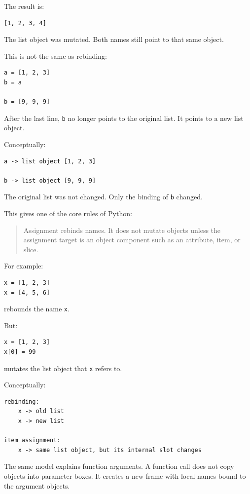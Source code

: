 The result is:

\begin{verbatim}
[1, 2, 3, 4]
\end{verbatim}

The list object was mutated. Both names still point to that same object.

This is not the same as rebinding:

\begin{verbatim}
a = [1, 2, 3]
b = a

b = [9, 9, 9]
\end{verbatim}

After the last line, \texttt{b} no longer points to the original list. It points to a new list object.

Conceptually:

\begin{verbatim}
a -> list object [1, 2, 3]

b -> list object [9, 9, 9]
\end{verbatim}

The original list was not changed. Only the binding of \texttt{b} changed.

This gives one of the core rules of Python:

\begin{quote}
Assignment rebinds names. It does not mutate objects unless the assignment target is an object component such as an attribute, item, or slice.
\end{quote}

For example:

\begin{verbatim}
x = [1, 2, 3]
x = [4, 5, 6]
\end{verbatim}

rebounds the name \texttt{x}.

But:

\begin{verbatim}
x = [1, 2, 3]
x[0] = 99
\end{verbatim}

mutates the list object that \texttt{x} refers to.

Conceptually:

\begin{verbatim}
rebinding:
    x -> old list
    x -> new list

item assignment:
    x -> same list object, but its internal slot changes
\end{verbatim}

The same model explains function arguments. A function call does not copy objects into parameter boxes. It creates a new frame with local names bound to the argument objects.

